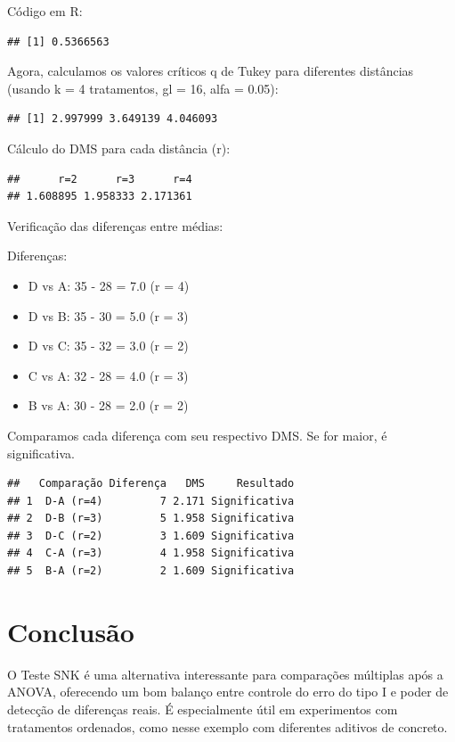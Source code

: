 \documentclass[
]{article}
\providecommand{\tightlist}{%
  \setlength{\itemsep}{0pt}\setlength{\parskip}{0pt}}
\begin{document}
Código em R:

\begin{verbatim}
## [1] 0.5366563
\end{verbatim}

Agora, calculamos os valores críticos q de Tukey para diferentes
distâncias (usando k = 4 tratamentos, gl = 16, alfa = 0.05):

\begin{verbatim}
## [1] 2.997999 3.649139 4.046093
\end{verbatim}

Cálculo do DMS para cada distância (r):

\begin{verbatim}
##      r=2      r=3      r=4 
## 1.608895 1.958333 2.171361
\end{verbatim}

Verificação das diferenças entre médias:

Diferenças:

\begin{itemize}
\tightlist
\item
  D vs A: 35 - 28 = 7.0 (r = 4)
\item
  D vs B: 35 - 30 = 5.0 (r = 3)
\item
  D vs C: 35 - 32 = 3.0 (r = 2)
\item
  C vs A: 32 - 28 = 4.0 (r = 3)
\item
  B vs A: 30 - 28 = 2.0 (r = 2)
\end{itemize}

Comparamos cada diferença com seu respectivo DMS. Se for maior, é
significativa.

\begin{verbatim}
##   Comparação Diferença   DMS     Resultado
## 1  D-A (r=4)         7 2.171 Significativa
## 2  D-B (r=3)         5 1.958 Significativa
## 3  D-C (r=2)         3 1.609 Significativa
## 4  C-A (r=3)         4 1.958 Significativa
## 5  B-A (r=2)         2 1.609 Significativa
\end{verbatim}

\section{Conclusão}\label{conclusuxe3o}

O Teste SNK é uma alternativa interessante para comparações múltiplas
após a ANOVA, oferecendo um bom balanço entre controle do erro do tipo I
e poder de detecção de diferenças reais. É especialmente útil em
experimentos com tratamentos ordenados, como nesse exemplo com
diferentes aditivos de concreto.
\end{document}
